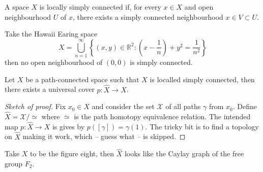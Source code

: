 \begin{definition}
    A space $X$ is locally simply connected if, for every $x\in X$ and open neighbourhood $U$ of $x$, there exists a simply connected neighbourhood $x\in V\subset U$.
\end{definition}
\begin{example}
    Take the Hawaii Earing space
    $$X=\bigcup_{n=1}^\infty \left\{(x,y)\in\mathbb R^2:\left( x-\frac{1}{n} \right)+y^2=\frac{1}{n^2}\right\}$$
    then no open neighbourhood of $(0,0)$ is simply connected.
\end{example}
\begin{theorem}
    Let $X$ be a path-connected space such that $X$ is localled simply connected, then there exists a universal cover $p:\hat{X}\to X$.
\end{theorem}
\begin{proof}[Sketch of proof]
    Fix $x_0\in X$ and consider the set $\mathscr X$ of all paths $\gamma$ from $x_0$.
    Define $\hat{X}=\mathscr X/\simeq$ where $\simeq$ is the path homotopy equivalence relation.
    The intended map $p:\hat{X}\to X$ is gives by $p([\gamma])=\gamma(1)$.
    The tricky bit is to find a topology on $\hat{X}$ making it work, which -- guess what -- is skipped.
\end{proof}
\begin{example}
    Take $X$ to be the figure eight, then $\hat{X}$ looks like the Caylay graph of the free group $F_2$.
\end{example}
